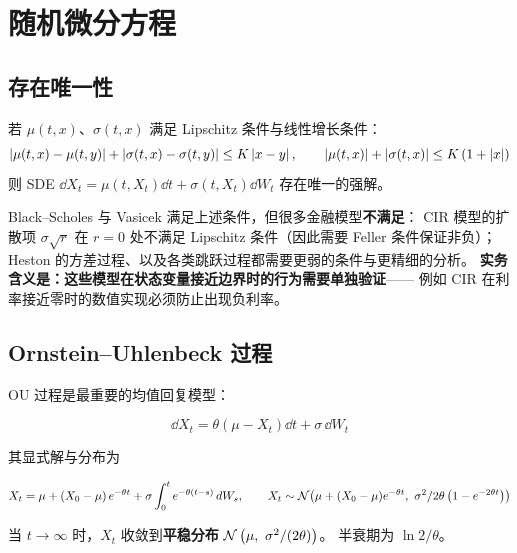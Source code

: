 \section{随机微分方程}

\subsection{存在唯一性}

\begin{theorem}\label{thm:10-existence}
若 $\mu(t,x)$、$\sigma(t,x)$ 满足 Lipschitz 条件与线性增长条件：
\begin{equation}
  \left\lvert \mu(t,x)-\mu(t,y) \right\rvert+\left\lvert \sigma(t,x)-\sigma(t,y) \right\rvert\le K\left\lvert x-y \right\rvert,
  \qquad
  \left\lvert \mu(t,x) \right\rvert+\left\lvert \sigma(t,x) \right\rvert\le K\left(1+\left\lvert x \right\rvert\right)
  \label{eq:10-lipschitz}
\end{equation}
则 SDE $\dd X_t=\mu(t,X_t)\dd t+\sigma(t,X_t)\dd W_t$ 存在唯一的强解。
\end{theorem}

\begin{notebox}[为什么金融模型经常「违规」]
Black--Scholes 与 Vasicek 满足上述条件，但很多金融模型\textbf{不满足}：
CIR 模型的扩散项 $\sigma\sqrt{r}$ 在 $r=0$ 处不满足 Lipschitz 条件（因此需要 Feller 条件保证非负）；
Heston 的方差过程、以及各类跳跃过程都需要更弱的条件与更精细的分析。
\textbf{实务含义是：这些模型在状态变量接近边界时的行为需要单独验证}——
例如 CIR 在利率接近零时的数值实现必须防止出现负利率。
\end{notebox}

\subsection{Ornstein--Uhlenbeck 过程}

OU 过程是最重要的均值回复模型：

\begin{equation}
  \dd X_t = \theta\left(\mu-X_t\right)\dd t+\sigma\,\dd W_t
  \label{eq:10-ou}
\end{equation}

其显式解与分布为

\begin{equation}
  X_t = \mu+\left(X_0-\mu\right)\ee^{-\theta t}+\sigma\int_0^{t}\ee^{-\theta(t-s)}\,\dd W_s,
  \qquad
  X_t\sim\N\!\left(\mu+(X_0-\mu)\ee^{-\theta t},\ \frac{\sigma^{2}}{2\theta}\left(1-\ee^{-2\theta t}\right)\right)
  \label{eq:10-ou-sol}
\end{equation}

当 $t\to\infty$ 时，$X_t$ 收敛到\textbf{平稳分布} $\N\left(\mu,\ \sigma^2/(2\theta)\right)$。
半衰期为 $\ln 2/\theta$。

